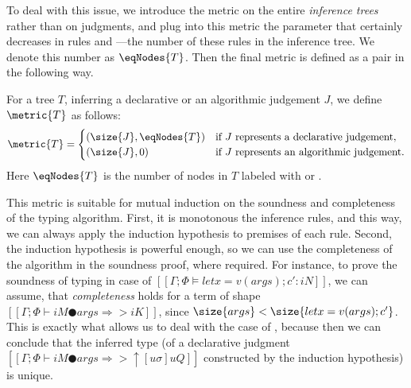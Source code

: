 To deal with this issue, we introduce the metric on the entire 
\emph{inference trees} rather than on judgments, and plug into this metric the
parameter that certainly decreases in rules  and ---the number of these rules in the inference tree. We
denote this number as $\eqNodes{T}$.  Then the final metric is defined as a pair in the following way.

\begin{definition*}
    For a tree $T$, inferring a declarative or an algorithmic judgement $J$, we define $\metric{T}$ as follows:
        \[
        \metric{T} = \begin{cases}
        (\size{J}, \eqNodes{T}) & \text{if } J \text{ represents a declarative judgement}, \\
        (\size{J}, 0) & \text{if } J \text{ represents an algorithmic judgement}.
        \end{cases}
        \]
    Here $\eqNodes{T}$ is the number of nodes in $T$ labeled with  or .
\end{definition*}

This metric is suitable for mutual induction on the soundness and completeness
of the typing algorithm.  First, it is monotonous \wrt the inference rules,
and this way, we can always apply the induction hypothesis to premises 
of each rule. Second, the induction hypothesis is powerful enough,
so we can use the completeness of the algorithm in the soundness proof,
where required. For instance, to prove the soundness
of typing in case of $[[Γ; Φ ⊨ let x = v(args); c' : iN]]$,
we can assume, that  \emph{completeness}
holds for a term of shape $[[Γ; Φ ⊢ iM ● args ⇒> iK ]]$, since
$\size{args} < \size{let x = v(args); c'}$.
This is exactly what allows us to 
deal with the case of ,
because then we can conclude that 
the inferred type (of a declarative judgment $[[Γ; Φ ⊢ iM ● args ⇒> ↑[uσ]uQ
]]$ constructed by the induction hypothesis) is unique.

